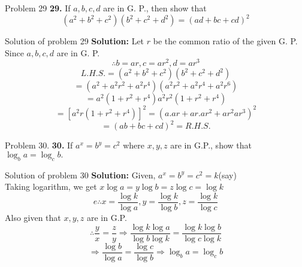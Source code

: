 \documentclass[aspectratio=1610,8pt]{beamer}
\begin{document}
\begin{frame}{Problem 29}
  \textbf{29.} If $a,b,c,d$ are in G. P., then show that $$(a^2 + b^2 + c^2)(b^2 + c^2 + d^2) = (ad + bc + cd)^2$$
\end{frame}
\begin{frame}{Solution of problem 29}
  \textbf{Solution:} Let $r$ be the common ratio of the given G. P. Since $a,b,c,d$ are in G. P.
  $$\therefore b = ar, c = ar^2, d = ar^3$$
  $$L.H.S. = (a^2 + b^2 + c^2)(b^2 + c^2 + d^2)$$
  $$= (a^2 + a^2r^2 + a^2r^4)(a^2r^2 + a^2r^4 + a^2r^6)$$
  $$= a^2(1 + r^2 + r^4)a^2r^2(1 + r^2 + r^4)$$
  $$= [a^2r(1 + r^2 + r^4)]^2 = (a.ar + ar.ar^2 + ar^2ar^3)^2$$
  $$= (ab + bc + cd)^2 = R.H.S.$$
\end{frame}
\begin{frame}{Problem 30.}
  \textbf{30.} If $a^x = b^y = c^2$ where $x, y, z$ are in G.P., show that $\log_ba = \log_cb.$
\end{frame}
\begin{frame}{Solution of problem 30}
  \textbf{Solution:} Given, $a^x = b^y = c^2 = k$(say)\\
  Taking logarithm, we get $x\log a = y\log b = z\log c = \log k$
  $$e\therefore x = \frac{\log k}{\log a}, y = \frac{\log k}{\log b}, z = \frac{\log k}{\log c}$$
  Also given that $x, y, z$ are in G.P.
  $$\therefore \frac{y}{x} = \frac{z}{y} \Rightarrow \frac{\log k\log a}{\log b\log k} = \frac{\log k\log b}{\log c\log k}$$
  $$\Rightarrow \frac{\log b}{\log a} = \frac{\log c}{\log b}\Rightarrow \log_ba = \log_cb$$
\end{frame}
\end{document}
